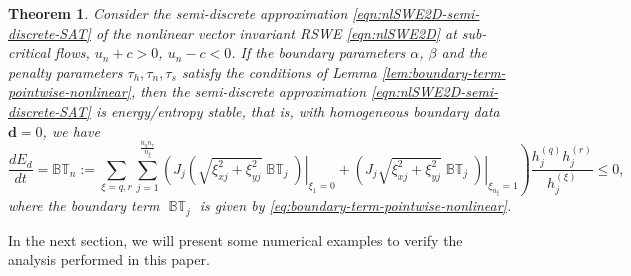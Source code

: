 \documentclass{article}
\numberwithin{equation}{section}
\newtheorem{theorem}{Theorem}
\theoremstyle{definition}
\begin{document}
\begin{theorem}
    Consider the semi-discrete approximation  \eqref{eqn:nlSWE2D-semi-discrete-SAT} of the nonlinear vector invariant  RSWE \eqref{eqn:nlSWE2D} 
    at sub-critical flows, $ u_n + c >0$, $u_n-c < 0$. If the boundary parameters $\alpha$, $\beta$ and the penalty parameters $\tau_h,\tau_n,\tau_s$ satisfy the conditions of Lemma \ref{lem:boundary-term-pointwise-nonlinear},  then the semi-discrete approximation  \eqref{eqn:nlSWE2D-semi-discrete-SAT} is energy/entropy stable, that is, with homogeneous boundary data $\bm{d}=0$, we have
    $$
    \frac{dE_d}{dt} = \mathbb{BT}_n:= \sum_{\xi = q, r}\sum_{j=1}^{\frac{n_qn_r}{n_\xi}} \left.\left(J_j\left(\sqrt{\xi_{xj}^2 + \xi_{yj}^2}\operatorname{\mathbb{BT}}_j\right)\right|_{\xi_{1} = 0} + \left.\left(J_j\sqrt{\xi_{xj}^2 + \xi_{yj}^2}\operatorname{\mathbb{BT}}_j\right)\right|_{\xi_{n_\xi} = 1}\right) \frac{h_j^{(q)}h_j^{(r)}}{h_j^{(\xi)}}\le 0,
    $$
    where the boundary term $\operatorname{\mathbb{BT}}_j$ is given by \eqref{eq:boundary-term-pointwise-nonlinear}.
\end{theorem} 




In the next section, we will present some numerical examples to verify the analysis performed in  this paper.
\end{document}
